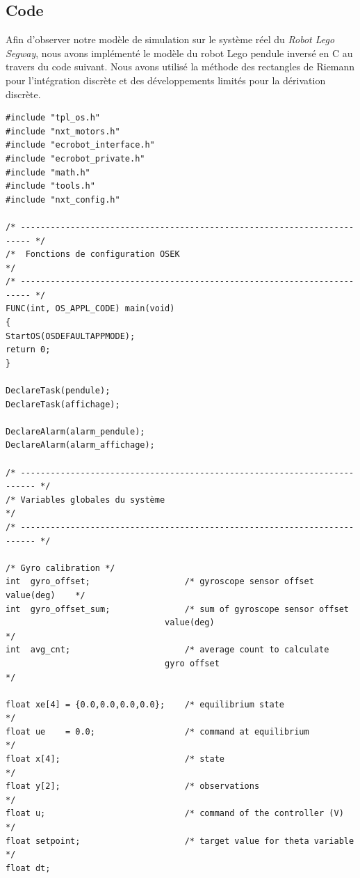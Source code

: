 \documentclass[a4paper]{article}
\begin{document}
                \subsection{Code}

                        \hspace{25pt} Afin d'observer notre modèle de simulation sur le système réel du \textit{Robot Lego Segway}, nous avons implémenté le modèle du robot Lego
                        pendule inversé en C au travers du code suivant. Nous avons utilisé la méthode des rectangles de Riemann pour l'intégration discrète et 
                        des développements limités pour la dérivation discrète.

                        \begin{verbatim}
#include "tpl_os.h"
#include "nxt_motors.h"
#include "ecrobot_interface.h" 
#include "ecrobot_private.h"
#include "math.h"
#include "tools.h"    
#include "nxt_config.h"         

/* ------------------------------------------------------------------------ */
/*  Fonctions de configuration OSEK                                         */
/* ------------------------------------------------------------------------ */
FUNC(int, OS_APPL_CODE) main(void)
{   
StartOS(OSDEFAULTAPPMODE);
return 0;
}

DeclareTask(pendule);
DeclareTask(affichage);

DeclareAlarm(alarm_pendule);
DeclareAlarm(alarm_affichage);

/* ------------------------------------------------------------------------- */
/* Variables globales du système                                             */
/* ------------------------------------------------------------------------- */

/* Gyro calibration */
int  gyro_offset;                   /* gyroscope sensor offset value(deg)    */
int  gyro_offset_sum;               /* sum of gyroscope sensor offset 
                                value(deg)                            */
int  avg_cnt;                       /* average count to calculate 
                                gyro offset                           */

float xe[4] = {0.0,0.0,0.0,0.0};    /* equilibrium state                     */
float ue    = 0.0;                  /* command at equilibrium                */
float x[4];                         /* state                                 */
float y[2];                         /* observations                          */
float u;                            /* command of the controller (V)         */
float setpoint;                     /* target value for theta variable       */
float dt;


\end{verbatim}
\end{document}
